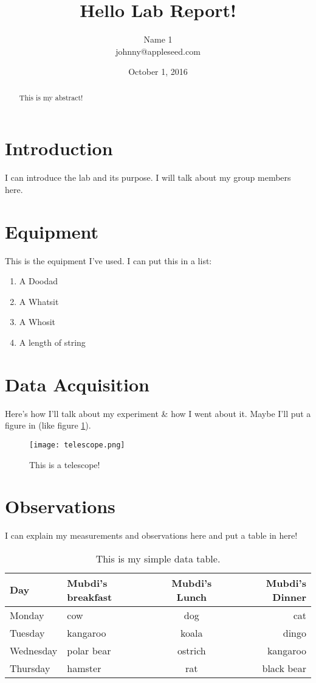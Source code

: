 \documentclass{article}
\author{Name 1 \\ johnny@appleseed.com}
\title{Hello Lab Report!}
\date{October 1, 2016}
\begin{document}
\maketitle

\begin{abstract}
This is my abstract!
\end{abstract}

\section{Introduction}

I can introduce the lab and its purpose. I will talk about my group members here. 

\section{Equipment}

This is the equipment I've used. I can put this in a list: 

\begin{enumerate}
\item A Doodad
\item A Whatsit
\item A Whosit
\item A length of string
\end{enumerate}

\section{Data Acquisition}

Here's how I'll talk about my experiment \& how I went about it. Maybe
I'll put a figure in (like figure \ref{fig1}). 

\begin{figure}
\begin{center}
\texttt{[image: telescope.png]}
\caption{This is a telescope! \label{fig1}}
\end{center}
\end{figure}

\section{Observations}

I can explain my measurements and observations here and put a table in here!

\begin{table}

\begin{tabular}{l|lcr}
Day & Mubdi's breakfast & Mubdi's Lunch & Mubdi's Dinner \\
\hline
Monday & cow & dog & cat \\
Tuesday & kangaroo & koala & dingo \\
Wednesday & polar bear & ostrich & kangaroo \\
Thursday & hamster & rat & black bear \\
\hline
\end{tabular}

\caption{This is my simple data table.}
\end{table}
\end{document}
